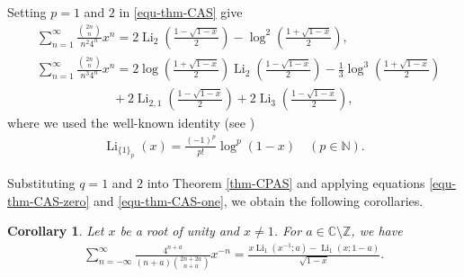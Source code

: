 \documentclass[11pt]{article}
\DeclareMathOperator{\Li}{Li}
\def\N{\mathbb{N}}
\def\Z{\mathbb{Z}}
\theoremstyle{plain}
\newtheorem{cor}[thm]{Corollary}
\theoremstyle{definition}
\begin{document}
Setting $p=1$ and $2$ in \eqref{equ-thm-CAS} give
\begin{align}
&\sum_{n=1}^\infty \frac{\binom{2n}{n}}{n^2 4^n}x^n=2\Li_2\left(\frac{1-\sqrt{1-x}}{2}\right)-\log^2\left(\frac{1+\sqrt{1-x}}{2}\right),\label{case-equ-apery-1}\\
&\sum_{n=1}^\infty \frac{\binom{2n}{n}}{n^3 4^n}x^n=2\log\left(\frac{1+\sqrt{1-x}}{2}\right)\Li_2\left(\frac{1-\sqrt{1-x}}{2}\right)-\frac1{3}\log^3\left(\frac{1+\sqrt{1-x}}{2}\right)\nonumber\\
&\qquad\qquad\qquad+2\Li_{2,1}\left(\frac{1-\sqrt{1-x}}{2}\right)+2\Li_3\left(\frac{1-\sqrt{1-x}}{2}\right),\label{case-equ-apery-2}
\end{align}
where we used the well-known identity (see \cite[Lemma 1(ii)]{AM1999})
\begin{align}\label{equ-p-1-Li}
\Li_{\{1\}_p}(x)=\frac{(-1)^p}{p!}\log^p(1-x)\quad (p\in\N).
\end{align}

Substituting $q=1$ and $2$ into Theorem \ref{thm-CPAS} and applying equations \eqref{equ-thm-CAS-zero} and \eqref{equ-thm-CAS-one}, we obtain the following corollaries.

\begin{cor} Let $x$ be a root of unity and $x\neq 1$. For $a\in \mathbb{C}\setminus \Z$, we have
\begin{align}\label{equ-cor-case-CPAS-one}
\sum_{n=-\infty}^\infty \frac{4^{n+a}}{(n+a)\binom{2n+2a}{n+a}}x^{-n}=\frac{x\Li_1(x^{-1};a)-\Li_1(x;1-a)}{\sqrt{1-x}}.
\end{align}
\end{cor}
\end{document}
